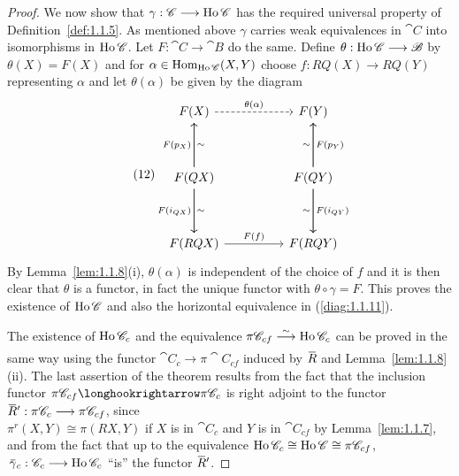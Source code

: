 \documentclass[../main]{subfiles}
\begin{document}
\begin{proof}
We now show that $\gamma : \mathscr{C} \longrightarrow \operatorname{Ho} \mathscr{C}$ has the required universal property of Definition~\ref{def:1.1.5}. As mentioned above $\gamma$ carries weak equivalences in $\cat C$ into isomorphisms in $\operatorname{Ho} \mathscr{C}$. Let $F : \cat C \longrightarrow \cat B$ do the same. Define $\theta : \operatorname{Ho} \mathscr{C} \longrightarrow \mathscr{B}$ by $\theta(X) = F(X)$ and for $\alpha \in \operatorname{Hom}_{\operatorname{Ho} \mathscr{C}}(X, Y)$ choose $f : RQ(X) \longrightarrow RQ(Y)$ representing $\alpha$ and let $\theta(\alpha)$ be given by the diagram
\[\tag{12}\label{diag:1.1.12}\begin{tikzcd}
	{F(X)} && {F(Y)} \\
	\\
	{F(QX)} && {F(QY)} \\
	\\
	{F(RQX)} && {F(RQY)}
	\arrow["{\theta(\alpha)}", dashed, from=1-1, to=1-3]
	\arrow["{F(f)}", from=5-1, to=5-3]
	\arrow["{F(p_X)}", from=3-1, to=1-1]
	\arrow["{F(i_{QX})}"', from=3-1, to=5-1]
	\arrow["{F(p_Y)}"', from=3-3, to=1-3]
	\arrow["{F(i_{QY})}", from=3-3, to=5-3]
	\arrow["\sim", from=3-1, to=5-1]
	\arrow["\sim"', from=3-1, to=1-1]
	\arrow["\sim"', from=3-3, to=5-3]
	\arrow["\sim", from=3-3, to=1-3]
\end{tikzcd}\]
By Lemma~\ref{lem:1.1.8}(i), $\theta(\alpha)$ is independent of the choice of $f$ and it is then clear that $\theta$ is a functor, in fact the unique functor with $\theta \circ \gamma = F$. This proves the existence of $\operatorname{Ho} \mathscr{C}$ and also the horizontal equivalence in (\ref{diag:1.1.11}).

The existence of $\operatorname{Ho} \mathscr{C}_c$ and the equivalence $\pi \cat C_{cf} \varrightarrow{\sim} \Ho \cat C_c$ can be proved in the same way using the functor $\cat C_c \longrightarrow \pi \cat C_{cf}$ induced by $\xoverline R$ and Lemma~\ref{lem:1.1.8}(ii). The last assertion of the theorem results from the fact that the inclusion functor $\pi \cat C_{cf} \longhookrightarrow \pi \cat C_c$ is right adjoint to the functor $\xoverline R' : \pi \cat C_c \longrightarrow \pi \cat C_{cf}$, since \\$\pi^r(X, Y) \cong \pi(RX, Y)$ if $X$ is in $\cat C_c$ and $Y$ is in $\cat C_{cf}$ by Lemma~\ref{lem:1.1.7}, and from the fact that up to the equivalence $\operatorname{Ho} \mathscr{C}_c \cong \operatorname{Ho} \mathscr{C} \cong \pi \mathscr{C}_{cf}$, $\,\xoverline \gamma_c : \cat C_c \longrightarrow \Ho \cat C_c$ ``is'' the functor $\xoverline R'$. 
\end{proof} 
\end{document}
